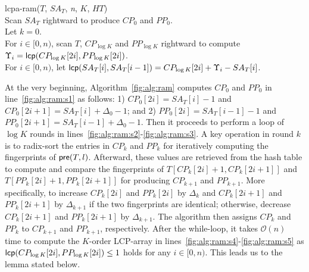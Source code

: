 \documentclass[10pt,journal,compsoc]{IEEEtran}
\begin{document}
\begin{CJK*}{GBK}{song}
\begin{algorithm}[hbtp!]
\caption{Compute $K$-Order $LCPA_T$ in RAM}
\label{fig:alg:ram}
lcpa-ram($T$, $SA_T$, {\em n}, $K$, $HT$){\\
\SetAlgoNoLine
Scan $SA_T$ rightward to produce $CP_0$ and $PP_0$. \label{fig:alg:ram:s1}\\
Let $k = 0$. \\
\While{$k < \log K$}{\label{fig:alg:ram:s2}
\Indentp{-1em}
Radix-sort $CP_k$ and $PP_k$ to produce $ICP_k$ and $IPP_k$. \\
For $i\in [0,n)$, scan $T$ rightward to compute the fingerprint of ${\sf pre}(T,i)$ and let $FP[0,i]=HT[i]$ if $i\in \{ICP_k[j] \cup IPP_k[j], j\in[0,2n)\}$. \\
For $i\in [0,n)$, scan $CP_k$ and $PP_k$ rightward to compute and compare $FP[CP_k[2i]+1,CP_k[2i+1]]$ and $FP[PP_k[2i]+1,PP_k[2i+1]]$ for generating $CP_{k+1}$ and $PP_{k+1}$. \\
Let $k = k +1$ and clear $HT$. \\
} \label{fig:alg:ram:s3}
For $i\in [0,n)$, scan $T$, $CP_{\log K}$ and $PP_{\log K}$ rightward to compute $\Upsilon_i = {\sf lcp}(CP_{\log K}[2i],PP_{\log K}[2i])$. \label{fig:alg:ram:s4}\\
For $i\in [0,n)$, let ${\sf lcp}(SA_T[i],SA_T[i-1])=CP_{\log K}[2i] +\Upsilon_i-SA_T[i]$. \label{fig:alg:ram:s5}\\
}
\end{algorithm}

At the very beginning, Algorithm~\ref{fig:alg:ram} computes $CP_0$ and $PP_0$ in line~\ref{fig:alg:ram:s1} as follows: 1) $CP_0[2i]=SA_T[i]-1$ and $CP_0[2i+1]=SA_T[i]+ \Delta_0 - 1$; and 2) $PP_0[2i]=SA_T[i-1]-1$ and $PP_0[2i+1]=SA_T[i-1]+ \Delta_0 - 1$. Then it proceeds to perform a loop of $\log K$ rounds in lines~\ref{fig:alg:ram:s2}-\ref{fig:alg:ram:s3}. A key operation in round $k$ is to radix-sort the entries in $CP_k$ and $PP_k$ for iteratively computing the fingerprints of ${\sf pre}(T,l)$. Afterward, these values are retrieved from the hash table to compute and compare the fingerprints of $T[CP_k[2i]+1,CP_k[2i+1]]$ and $T [PP_k[2i]+1,PP_k[2i+1]]$ for producing $CP_{k+1}$ and $PP_{k+1}$. More specifically, to increase $CP_{k}[2i]$ and $PP_{k}[2i]$ by $\Delta_k$ and $CP_{k}[2i+1]$ and $PP_{k}[2i+1]$ by $\Delta_{k+1}$ if the two fingerprints are identical; otherwise, decrease $CP_{k}[2i+1]$ and $PP_{k}[2i+1]$ by $\Delta_{k+1}$. The algorithm then assigns $CP_k$ and $PP_k$ to $CP_{k+1}$ and $PP_{k+1}$, respectively. After the while-loop, it takes $\mathcal{O}(n)$ time to compute the $K$-order LCP-array in lines~\ref{fig:alg:ram:s4}-\ref{fig:alg:ram:s5} as ${\sf lcp}(CP_{\log K}[2i],PP_{\log K}[2i]) \le 1$ holds for any $i \in [0,n)$. This leads us to the lemma stated below.


\end{CJK*}
\end{document}
